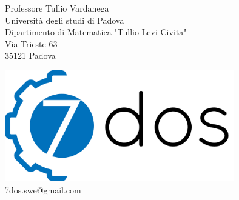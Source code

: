 \begin{letter}{Professore Tullio Vardanega \\ Università degli studi di Padova \\ Dipartimento di Matematica "Tullio Levi-Civita" \\ Via Trieste 63 \\ 35121 Padova} %

\begin{center}
\includegraphics[width=10cm]{../logo}
7dos.swe@gmail.com
\end{center}


\end{letter}
